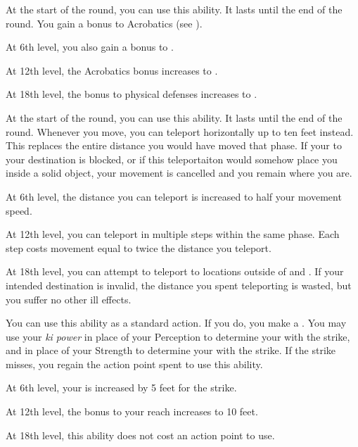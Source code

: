 {            
            At the start of the round, you can use this ability.
            It lasts until the end of the round.
            You gain a  bonus to Acrobatics (see ).
            \par At 6th level, you also gain a  bonus to .
            \par At 12th level, the Acrobatics bonus increases to .
            \par At 18th level, the bonus to physical defenses increases to .

            At the start of the round, you can use this ability.
            It lasts until the end of the round.
            Whenever you move, you can teleport horizontally up to ten feet instead.
            This replaces the entire distance you would have moved that phase.
            If your  to your destination is blocked, or if this teleportaiton would somehow place you inside a solid object, your movement is cancelled and you remain where you are.
            \par At 6th level, the distance you can teleport is increased to half your movement speed.
            \par At 12th level, you can teleport in multiple steps within the same phase.
            Each step costs movement equal to twice the distance you teleport.
            \par At 18th level, you can attempt to teleport to locations outside of  and .
            If your intended destination is invalid, the distance you spent teleporting is wasted, but you suffer no other ill effects.

            You can use this ability as a standard action.
            If you do, you make a .
            You may use your \textit{ki power} in place of your Perception to determine your  with the strike, and in place of your Strength to determine your  with the strike.
            If the strike misses, you regain the action point spent to use this ability.
            \par At 6th level, your  is increased by 5 feet for the strike.
            \par At 12th level, the bonus to your reach increases to 10 feet. 
            \par At 18th level, this ability does not cost an action point to use.

}
